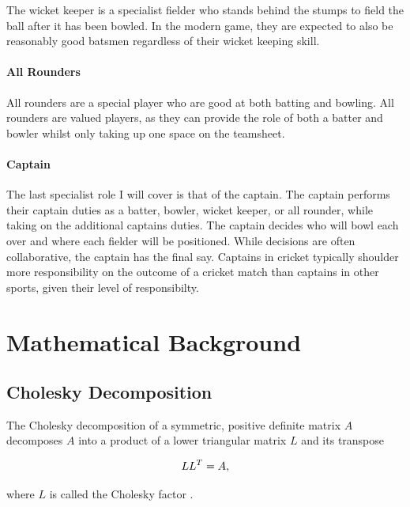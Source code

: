 \documentclass[12pt,a4paper]{report}
\theoremstyle{definition}
\begin{document}
The wicket keeper is a specialist fielder who stands behind the stumps to field the ball after it has been bowled.
In the modern game, they are expected to also be reasonably good batsmen regardless of their wicket keeping skill.

\subsubsection{All Rounders}

All rounders are a special player who are good at both batting and bowling.
All rounders are valued players, as they can provide the role of both a batter and bowler whilst only taking up one space on the teamsheet.

\subsubsection{Captain}

The last specialist role I will cover is that of the captain. 
The captain performs their captain duties as a batter, bowler, wicket keeper, or all rounder, while taking on the additional captains duties.
The captain decides who will bowl each over and where each fielder will be positioned. 
While decisions are often collaborative, the captain has the final say.
Captains in cricket typically shoulder more responsibility on the outcome of a cricket match than captains in other sports, given their level of responsibilty.

\chapter{Mathematical Background}

\section{Cholesky Decomposition} \label{sec:CholDecomp}

The Cholesky decomposition of a symmetric, positive definite matrix $A$ decomposes $A$ into a product of a lower triangular matrix $L$ and its transpose

\begin{equation}
	\centering
	LL^T = A,
\end{equation}

where $L$ is called the Cholesky factor \citep{RasmussenWilliams2006}. 
\end{document}
